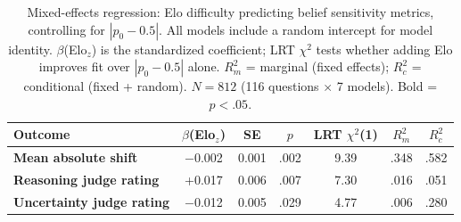 \begin{table}[t]
\centering
\small
\begin{tabular}{lcccccc}
\toprule
\textbf{Outcome} & \textbf{$\beta$(Elo$_z$)} & \textbf{SE} & \textbf{$p$} & \textbf{LRT $\chi^2$(1)} & \textbf{$R^2_m$} & \textbf{$R^2_c$} \\
\midrule
\textbf{Mean absolute shift} & $-$0.002 & 0.001 & .002 & 9.39 & .348 & .582 \\
\textbf{Reasoning judge rating} & +0.017 & 0.006 & .007 & 7.30 & .016 & .051 \\
\textbf{Uncertainty judge rating} & $-$0.012 & 0.005 & .029 & 4.77 & .006 & .280 \\
\bottomrule
\end{tabular}
\caption{Mixed-effects regression: Elo difficulty predicting belief sensitivity metrics, controlling for $|p_0 - 0.5|$. All models include a random intercept for model identity. $\beta$(Elo$_z$) is the standardized coefficient; LRT $\chi^2$ tests whether adding Elo improves fit over $|p_0 - 0.5|$ alone. $R^2_m$ = marginal (fixed effects); $R^2_c$ = conditional (fixed + random). $N = 812$ (116 questions $\times$ 7 models). Bold = $p < .05$.}
\label{tab:elo_regression}
\end{table}